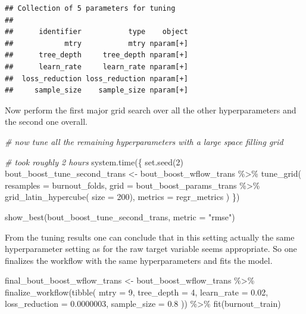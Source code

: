 \documentclass[
]{book}
\newenvironment{Shaded}{\begin{snugshade}}{\end{snugshade}}
\newcommand{\AttributeTok}[1]{\textcolor[rgb]{0.77,0.63,0.00}{#1}}
\newcommand{\CommentTok}[1]{\textcolor[rgb]{0.56,0.35,0.01}{\textit{#1}}}
\newcommand{\DecValTok}[1]{\textcolor[rgb]{0.00,0.00,0.81}{#1}}
\newcommand{\FloatTok}[1]{\textcolor[rgb]{0.00,0.00,0.81}{#1}}
\newcommand{\FunctionTok}[1]{\textcolor[rgb]{0.00,0.00,0.00}{#1}}
\newcommand{\NormalTok}[1]{#1}
\newcommand{\OtherTok}[1]{\textcolor[rgb]{0.56,0.35,0.01}{#1}}
\newcommand{\SpecialCharTok}[1]{\textcolor[rgb]{0.00,0.00,0.00}{#1}}
\newcommand{\StringTok}[1]{\textcolor[rgb]{0.31,0.60,0.02}{#1}}
\begin{document}
\begin{verbatim}
## Collection of 5 parameters for tuning
## 
##      identifier           type    object
##            mtry           mtry nparam[+]
##      tree_depth     tree_depth nparam[+]
##      learn_rate     learn_rate nparam[+]
##  loss_reduction loss_reduction nparam[+]
##     sample_size    sample_size nparam[+]
\end{verbatim}

Now perform the first major grid search over all the other hyperparameters and the second one overall.

\begin{Shaded}
\begin{Highlighting}[]
\CommentTok{\# now tune all the remaining hyperparameters with a large space filling grid}

\CommentTok{\# took roughly 2 hours}
\FunctionTok{system.time}\NormalTok{(\{}
  \FunctionTok{set.seed}\NormalTok{(}\DecValTok{2}\NormalTok{)}
\NormalTok{  bout\_boost\_tune\_second\_trans }\OtherTok{\textless{}{-}}\NormalTok{ bout\_boost\_wflow\_trans }\SpecialCharTok{\%\textgreater{}\%}
    \FunctionTok{tune\_grid}\NormalTok{(}
      \AttributeTok{resamples =}\NormalTok{ burnout\_folds,}
      \AttributeTok{grid =}\NormalTok{ bout\_boost\_params\_trans }\SpecialCharTok{\%\textgreater{}\%}
        \FunctionTok{grid\_latin\_hypercube}\NormalTok{(}
          \AttributeTok{size =} \DecValTok{200}\NormalTok{),}
      \AttributeTok{metrics =}\NormalTok{ regr\_metrics}
\NormalTok{    )}
\NormalTok{\})}

\FunctionTok{show\_best}\NormalTok{(bout\_boost\_tune\_second\_trans, }\AttributeTok{metric =} \StringTok{"rmse"}\NormalTok{)}
\end{Highlighting}
\end{Shaded}

From the tuning results one can conclude that in this setting actually the same hyperparameter setting as for the raw target variable seems appropriate. So one finalizes the workflow with the same hyperparameters and fits the model.

\begin{Shaded}
\begin{Highlighting}[]
\NormalTok{final\_bout\_boost\_wflow\_trans }\OtherTok{\textless{}{-}} 
\NormalTok{  bout\_boost\_wflow\_trans }\SpecialCharTok{\%\textgreater{}\%} 
  \FunctionTok{finalize\_workflow}\NormalTok{(}\FunctionTok{tibble}\NormalTok{(}
    \AttributeTok{mtry =} \DecValTok{9}\NormalTok{,}
    \AttributeTok{tree\_depth =} \DecValTok{4}\NormalTok{,}
    \AttributeTok{learn\_rate =} \FloatTok{0.02}\NormalTok{,}
    \AttributeTok{loss\_reduction =} \FloatTok{0.0000003}\NormalTok{,}
    \AttributeTok{sample\_size =} \FloatTok{0.8}
\NormalTok{  )) }\SpecialCharTok{\%\textgreater{}\%}
  \FunctionTok{fit}\NormalTok{(burnout\_train)}
\end{Highlighting}
\end{Shaded}
\end{document}
